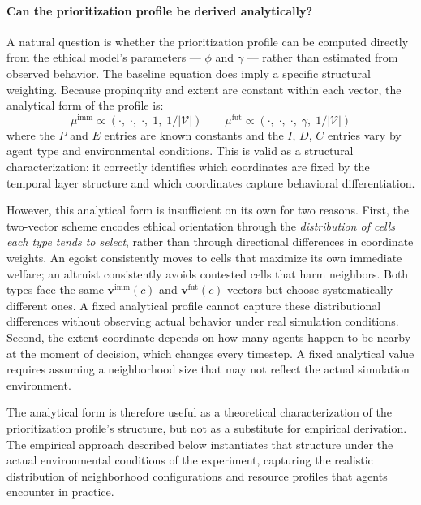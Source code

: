 \documentclass{icsthesis}
\begin{document}
\begin{mainmatter}
\paragraph{Can the prioritization profile be derived analytically?}
A natural question is whether the prioritization profile can be computed directly from the ethical model’s parameters --- $\phi$ and $\gamma$ --- rather than estimated from observed behavior. The baseline equation does imply a specific structural weighting. Because propinquity and extent are constant within each vector, the analytical form of the profile is:
\[
\mu^{\mathrm{imm}} \propto \left(\cdot,\; \cdot,\; \cdot,\; 1,\; 1/|\mathcal{V}|\right)
\qquad
\mu^{\mathrm{fut}} \propto \left(\cdot,\; \cdot,\; \cdot,\; \gamma,\; 1/|\mathcal{V}|\right)
\]
where the $P$ and $E$ entries are known constants and the $I$, $D$, $C$ entries vary by agent type and environmental conditions. This is valid as a structural characterization: it correctly identifies which coordinates are fixed by the temporal layer structure and which coordinates capture behavioral differentiation.

However, this analytical form is insufficient on its own for two reasons. First, the two-vector scheme encodes ethical orientation through the \emph{distribution of cells each type tends to select}, rather than through directional differences in coordinate weights. An egoist consistently moves to cells that maximize its own immediate welfare; an altruist consistently avoids contested cells that harm neighbors. Both types face the same $\mathbf{v}^{\mathrm{imm}}(c)$ and $\mathbf{v}^{\mathrm{fut}}(c)$ vectors but choose systematically different ones. A fixed analytical profile cannot capture these distributional differences without observing actual behavior under real simulation conditions. Second, the extent coordinate depends on how many agents happen to be nearby at the moment of decision, which changes every timestep. A fixed analytical value requires assuming a neighborhood size that may not reflect the actual simulation environment.

The analytical form is therefore useful as a theoretical characterization of the prioritization profile’s structure, but not as a substitute for empirical derivation. The empirical approach described below instantiates that structure under the actual environmental conditions of the experiment, capturing the realistic distribution of neighborhood configurations and resource profiles that agents encounter in practice.


\end{mainmatter}
\end{document}
